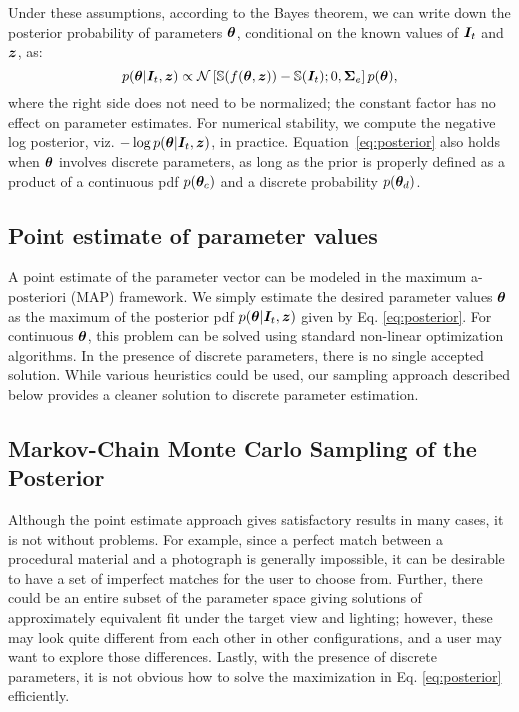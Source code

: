 Under these assumptions, according to the Bayes theorem, we can write down the posterior probability of parameters $\bm{\theta}$, conditional on the known values of $\bm{I}_t$ and $\bm{z}$, as:
\begin{equation} 
	\label{eq:posterior}
	p(\bm{\theta} | \bm{I}_t, \bm{z}) \propto \mathcal{N}\left[\mathbb{S}(f(\bm{\theta}, \bm{z})) - \mathbb{S}(\bm{I}_t); 0, \bm{\Sigma}_e\right] p(\bm{\theta}),
\end{equation}
where the right side does not need to be normalized; the constant factor has no effect on parameter estimates.
For numerical stability, we compute the negative log posterior, viz. $-\log p(\bm{\theta} | \bm{I}_t, \bm{z})$, in practice. Equation~\eqref{eq:posterior} also holds when $\bm{\theta}$ involves discrete parameters, as long as the prior is properly defined as a product of a continuous pdf $p(\bm{\theta}_c)$ and a discrete probability $p(\bm{\theta}_d)$.

\subsection{Point estimate of parameter values}

A point estimate of the parameter vector can be modeled in the maximum a-posteriori (MAP) framework. We simply estimate the desired parameter values $\bm{\theta}$ as the maximum of the posterior pdf $p(\bm{\theta} | \bm{I}_t, \bm{z})$ given by Eq. \eqref{eq:posterior}. For continuous $\bm{\theta}$, this problem can be solved using standard non-linear optimization algorithms. In the presence of discrete parameters, there is no single accepted solution. While various heuristics could be used, our sampling approach described below provides a cleaner solution to discrete parameter estimation.

\subsection{Markov-Chain Monte Carlo Sampling of the Posterior}
\label{ssec:bayesian}

Although the point estimate approach gives satisfactory results in many cases, it is not without problems. For example, since a perfect match between a procedural material and a photograph is generally impossible, it can be desirable to have a set of imperfect matches for the user to choose from. Further, there could be an entire subset of the parameter space giving solutions of approximately equivalent fit under the target view and lighting; however, these may look quite different from each other in other configurations, and a user may want to explore those differences. Lastly, with the presence of discrete parameters, it is not obvious how to solve the maximization in Eq. \eqref{eq:posterior} efficiently.


